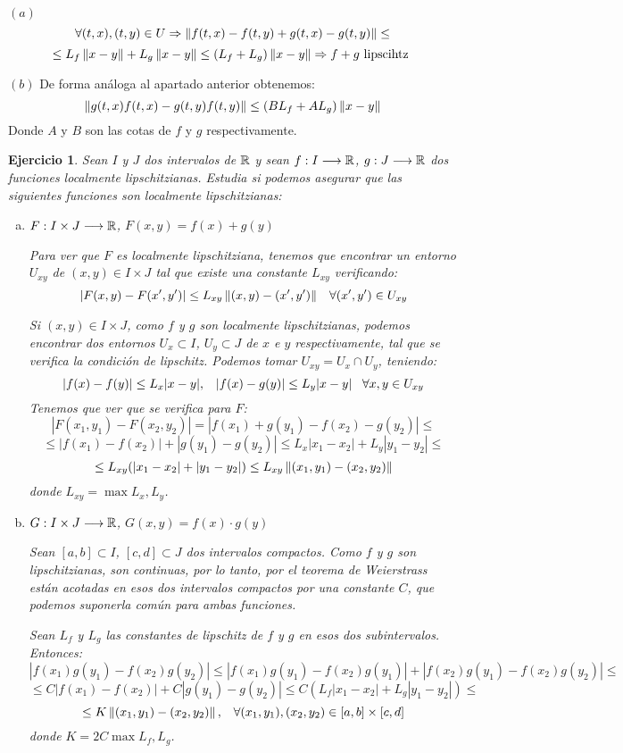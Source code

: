 \documentclass[12pt]{article}
\newtheorem{ejercicio}{Ejercicio}
\theoremstyle{definition}
\theoremstyle{remark}
\begin{document}
$(a)$
\[
\forall(t,x),(t,y)\in U \Rightarrow \left\lVert f(t,x)-f(t,y)+g(t,x)-g(t,y)\right\rVert\leq
\]
\[
\leq L_f\left\lVert x-y\right\rVert+L_g\left\lVert x-y\right\rVert\leq (L_f+L_g)\left\lVert x-y\right\rVert \Rightarrow f+g \text{ lipscihtz }
\]

$(b)$ De forma análoga al apartado anterior obtenemos:
\[
\left\lVert g(t,x)f(t,x)-g(t,y)f(t,y)\right\rVert\leq (BL_f+AL_g)\left\lVert x-y\right\rVert
\]
Donde $A$ y $B$ son las cotas de $f$ y $g$ respectivamente.

\begin{ejercicio}
Sean $I$ y $J$ dos intervalos de $\mathbb{R}$ y sean $f : I \longrightarrow \mathbb{R}$, $g : J \longrightarrow \mathbb{R}$ dos funciones localmente lipschitzianas. Estudia si podemos asegurar que las siguientes funciones son localmente lipschitzianas:
\begin{enumerate}[(a)]
\item $F : I\times J \longrightarrow \mathbb{R}$, $F(x,y)=f(x)+g(y)$

Para ver que $F$ es localmente lipschitziana, tenemos que encontrar un entorno $U_{xy}$  de $(x,y)\in I\times J$ tal que existe una constante $L_{xy}$ verificando:
\[
|F(x,y)-F(x',y')|\leq L_{xy}\left\lVert(x,y)-(x',y')\right\rVert \;\;\; \forall (x',y')\in U_{xy}
\]

Si $(x,y)\in I\times J$, como $f$ y $g$ son localmente lipschitzianas, podemos encontrar dos entornos $U_x \subset I$, $U_y\subset J$ de $x$ e $y$ respectivamente, tal que se verifica la condición de lipschitz. Podemos tomar $U_{xy}=U_x\cap U_y$, teniendo:
\[
|f(x)-f(y)|\leq L_{x}|x-y|, \;\;\; |f(x)-g(y)|\leq L_{y}|x-y| \;\;\; \forall x,y\in U_{xy}
\]
Tenemos que ver que se verifica para $F$:
\[
|F(x_1,y_1)-F(x_2,y_2)|=|f(x_1)+g(y_1)-f(x_2)-g(y_2)|\leq
\]
\[
\leq |f(x_1)-f(x_2)|+|g(y_1)-g(y_2)|\leq L_x|x_1-x_2|+L_y|y_1-y_2|\leq
\]
\[
\leq L_{xy}(|x_1-x_2|+|y_1-y_2|)\leq L_{xy}\left\lVert(x_1,y_1)-(x_2,y_2)\right\rVert
\]
donde $L_{xy}=\max{L_x,L_y}$.

\item $G : I\times J \longrightarrow \mathbb{R}$, $G(x,y)=f(x)\cdot g(y)$

Sean $[a,b]\subset I$, $[c,d]\subset J$ dos intervalos compactos. Como $f$ y $g$ son lipschitzianas, son continuas, por lo tanto, por el teorema de Weierstrass están acotadas en esos dos intervalos compactos por una constante $C$, que podemos suponerla común para ambas funciones.

Sean $L_f$ y $L_g$ las constantes de lipschitz de $f$ y $g$ en esos dos subintervalos. Entonces:
\[
|f(x_1)g(y_1)-f(x_2)g(y_2)|\leq |f(x_1)g(y_1)-f(x_2)g(y_1)|+|f(x_2)g(y_1)-f(x_2)g(y_2)|\leq
\]
\[
\leq C|f(x_1)-f(x_2)|+C|g(y_1)-g(y_2)|\leq C\left(L_f|x_1-x_2|+L_g|y_1-y_2|\right)\leq
\]
\[
\leq K\left\lVert(x_1,y_1)-(x_2,y_2)\right\rVert, \;\;\; \forall (x_1,y_1),(x_2,y_2)\in [a,b]\times[c,d] 
\]
donde $K=2C\max{L_f,L_g}$.

\end{enumerate}
\end{ejercicio}
\end{document}
